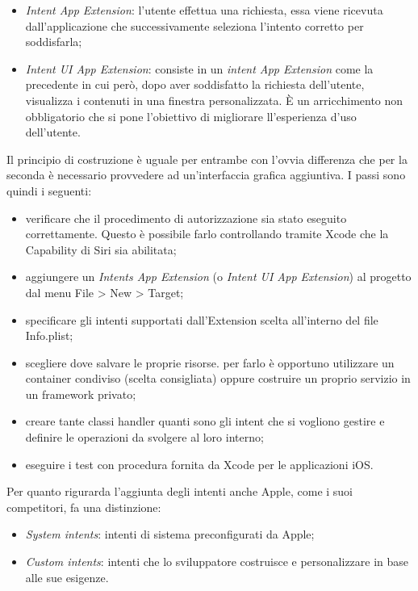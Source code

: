 		\begin{itemize}
			\item \emph{Intent App Extension}: l’utente effettua una richiesta, essa viene ricevuta dall’applicazione che successivamente seleziona l’intento corretto per soddisfarla;
			\item \emph{Intent UI App Extension}: consiste in un \emph{intent App Extension} come la precedente in cui però, dopo aver soddisfatto la richiesta dell’utente, visualizza i contenuti in una finestra personalizzata. È un arricchimento non obbligatorio che si pone l’obiettivo di migliorare ll'esperienza d'uso dell'utente.
		\end{itemize}
		Il principio di costruzione è uguale per entrambe con l'ovvia differenza che per la seconda è necessario provvedere ad un'interfaccia grafica aggiuntiva. I passi sono quindi i seguenti:
		\begin{itemize}
			\item verificare che il procedimento di autorizzazione sia stato eseguito correttamente. Questo è possibile farlo controllando tramite Xcode che la Capability di Siri sia abilitata;
			\item aggiungere un \emph{Intents App Extension} (o \emph{Intent UI App Extension}) al progetto dal menu File > New > Target;
			\item specificare gli intenti supportati dall’Extension scelta all’interno del file Info.plist;
			\item scegliere dove salvare le proprie risorse. per farlo è opportuno utilizzare un container condiviso (scelta consigliata) oppure costruire un proprio servizio in un framework privato;
			\item creare tante classi handler quanti sono gli intent che si vogliono gestire e definire le operazioni da svolgere al loro interno;
			\item eseguire i test con procedura fornita da Xcode per le applicazioni iOS.
		\end{itemize}
		Per quanto rigurarda l'aggiunta degli intenti anche Apple, come i suoi competitori, fa una distinzione:
		\begin{itemize}
			\item \emph{System intents}: intenti di sistema preconfigurati da Apple;
			\item \emph{Custom intents}: intenti che lo sviluppatore costruisce e personalizzare in base alle sue esigenze.
		\end{itemize}
		

